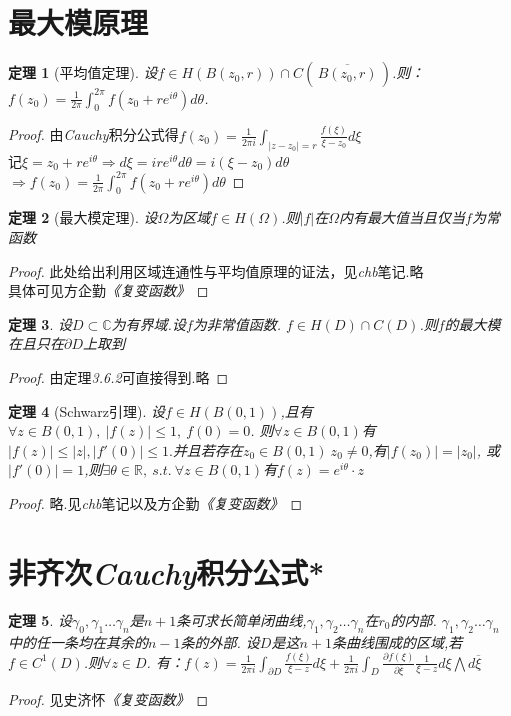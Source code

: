 \documentclass[b5paper,decoration]{qyxf-book}%
\newtheorem{mypro}{定理}[section]%
\begin{document}
\section{最大模原理}
\begin{mypro}[平均值定理]
    设$f\in H(B(z_0,r))\cap C(\,\overline{B(z_0,r)}\,)$.则：$\displaystyle{f(z_0)=\frac{1}{2\pi}\int_0^{2\pi}f(z_0+re^{i\theta})d\theta}$.
\end{mypro}
\begin{proof}
    由\emph{Cauchy}积分公式得$\displaystyle{f(z_0)=\frac{1}{2\pi i}\int_{|z-z_0|=r}\frac{f(\xi)}{\xi-z_0}d\xi}$\\
    记$\displaystyle{\xi=z_0+re^{i\theta}\Rightarrow d\xi=ire^{i\theta}d\theta=i(\xi-z_0)d\theta}$\\
    $\displaystyle{\Rightarrow f(z_0)=\frac{1}{2\pi}\int_0^{2\pi}f(z_0+re^{i\theta})d\theta}$
\end{proof}
\begin{mypro}[最大模定理]
    设$\Omega$为区域$f\in H(\Omega)$.则$|f|$在$\Omega$内有最大值当且仅当$f$为常函数
\end{mypro}
\begin{proof}
    此处给出利用区域连通性与平均值原理的证法，见\emph{chb}笔记.略\\
    具体可见方企勤\emph{《复变函数》}
\end{proof}

\begin{mypro}
    设$D\subset\mathbb{C}$为有界域.设$f$为非常值函数.
    $f\in H(D)\cap C(D)$.则$f$的最大模在且只在$\partial D$上取到
\end{mypro}
\begin{proof}
    由定理\emph{3.6.2}可直接得到.略
\end{proof}

\begin{mypro}[Schwarz引理]
    设$f\in H(B(0,1))$,且有$\forall z\in B(0,1),\ |f(z)|\leq1,\ f(0)=0$.
    则$\forall z\in B(0,1)$有$|f(z)|\leq|z|,|f'(0)|\leq1.$并且若存在$z_0\in B(0,1)\ z_0\neq 0$,有$|f(z_0)|=|z_0|$,
    或$|f'(0)|=1$,则$\exists\theta\in\mathbb{R},\ s.t.\ \forall z\in B(0,1)$有$f(z)=e^{i\theta}\cdot z$
\end{mypro}
\begin{proof}
    略.见\emph{chb}笔记以及方企勤\emph{《复变函数》}
\end{proof}

\section{非齐次\emph{Cauchy}积分公式*}
\begin{mypro}
    设$\gamma_0,\gamma_1\dots \gamma_n$是$n+1$条可求长简单闭曲线,$\gamma_1,\gamma_2\dots \gamma_n$在$r_0$的内部.
    $\gamma_1,\gamma_2\dots \gamma_n$中的任一条均在其余的$n-1$条的外部.
    设$D$是这$n+1$条曲线围成的区域,若$f\in C^1(D)$.则$\forall z\in D$.
    有：$\displaystyle{f(z)=\frac{1}{2\pi i}\int_{\partial D}\frac{f(\xi)}{\xi-z}d\xi
    +\frac{1}{2\pi i}\int_D\frac{\partial f(\xi)}{\partial\overline{\xi}}\frac{1}{\xi-z}d\xi\bigwedge d\overline{\xi}}$
\end{mypro}
\begin{proof}
    见史济怀\emph{《复变函数》}
\end{proof}
\end{document}
